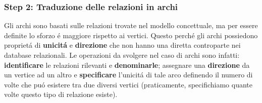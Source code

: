 \subsubsection*{Step 2: Traduzione delle relazioni in archi}
Gli archi sono basati sulle relazioni trovate nel modello concettuale, ma per essere definite lo sforzo é maggiore rispetto ai vertici. Questo perché gli archi possiedono proprietá di \textbf{unicitá} e \textbf{direzione} che non hanno una diretta controparte nei database relazionali. Le operazioni da svolgere nel caso di archi sono infatti: \textbf{identificare} le relazioni rilevanti e \textbf{denominarle}; assegnare una \textbf{direzione} da un vertice ad un altro e \textbf{specificare} l'unicitá di tale arco definendo il numero di volte che puó esistere tra due diversi vertici (praticamente, specifichiamo quante volte questo tipo di relazione esiste). 

